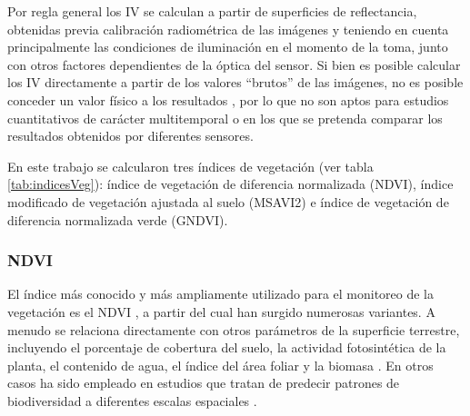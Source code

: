 \documentclass[spanish,openany]{article}
\begin{document}
Por regla general los IV se calculan a partir de superficies de
reflectancia, obtenidas previa calibración radiométrica de las imágenes
y teniendo en cuenta principalmente las condiciones de iluminación en el
momento de la toma, junto con otros factores dependientes de la óptica
del sensor. Si bien es posible calcular los IV directamente a partir de
los valores ``brutos'' de las imágenes, no es posible conceder un valor
físico a los resultados \citep{chuvieco2006teledeteccion}, por lo que no
son aptos para estudios cuantitativos de carácter multitemporal o en los
que se pretenda comparar los resultados obtenidos por diferentes
sensores.

En este trabajo se calcularon tres índices de vegetación (ver tabla
\ref{tab:indicesVeg}): índice de vegetación de diferencia normalizada
(NDVI), índice modificado de vegetación ajustada al suelo (MSAVI2) e
índice de vegetación de diferencia normalizada verde (GNDVI).

\begin{table}[!h]

\caption{\label{tab:indicesVeg}Índices de vegetación}
\centering
{}
\end{table}

\subsubsection{NDVI}\label{ndvi}

El índice más conocido y más ampliamente utilizado para el monitoreo de
la vegetación es el NDVI \citep{Rouse1973}, a partir del cual han
surgido numerosas variantes. A menudo se relaciona directamente con
otros parámetros de la superficie terrestre, incluyendo el porcentaje de
cobertura del suelo, la actividad fotosintética de la planta, el
contenido de agua, el índice del área foliar y la biomasa
\citep{pettorelli2013normalized}. En otros casos ha sido empleado en
estudios que tratan de predecir patrones de biodiversidad a diferentes
escalas espaciales \citep{Madonsela2018, Gillespie2011, Levin2007}.
\end{document}
